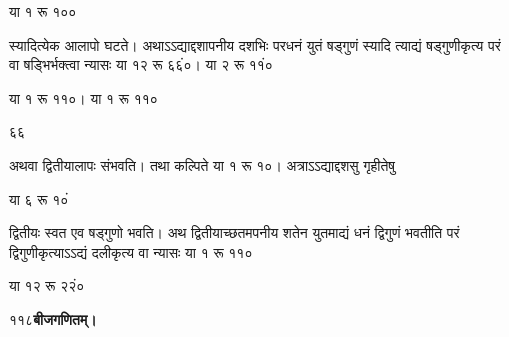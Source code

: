 \documentclass[11pt, openany]{book}
\begin{document}
\begin{sloppypar}
 या १ रू १००

\hangindent=0.2in स्यादित्येक आलापो घटते। अथाऽऽद्याद्दशापनीय दशभिः परधनं युतं षड्गुणं स्यादि त्याद्यं षड्गुणीकृत्य परं वा षड्भिर्भक्त्वा न्यासः या १२ रू ६६ं०। या २ रू ११ं०

\hspace{2in}या १ रू ११०। या १ रू ११०

\hspace{3.25in}६\hspace{0.2in}६

\hangindent=0.2in अथवा द्वितीयालापः संभवति। तथा कल्पिते या १ रू १०। अत्राऽऽद्याद्दशसु गृहीतेषु

\hspace{2.75in}या ६ रू १०ं

\hangindent=0.2in द्वितीयः स्वत एव षड्गुणो भवति। अथ द्वितीयाच्छतमपनीय शतेन युतमाद्यं धनं द्विगुणं भवतीति परं द्विगुणीकृत्याऽऽद्यं दलीकृत्य वा न्यासः या १ रू ११०

\hspace{2.5in}या १२ रू २२ं०
\end{sloppypar}
\thispagestyle{empty}
\newpage

\onehalfspacing
११८\hspace{2in}\textbf{बीजगणितम्।} 

\vspace{5mm}
\end{document}
